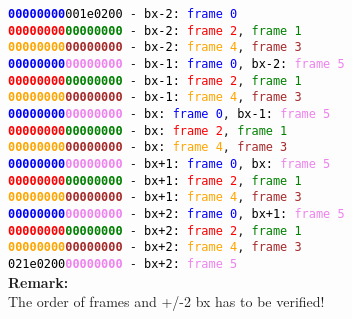 \texttt{\textcolor{blue}{\textbf{00000000}}\textcolor{black}{001e0200} - \textcolor{black}{bx-2:} \textcolor{blue}{frame 0}}\\
\texttt{\textcolor{red}{\textbf{00000000}}\textcolor{green}{\textbf{00000000}} - \textcolor{black}{bx-2:} \textcolor{red}{frame 2}, \textcolor{green}{frame 1}}\\
\texttt{\textcolor{orange}{\textbf{00000000}}\textcolor{brown}{\textbf{00000000}} - \textcolor{black}{bx-2:} \textcolor{orange}{frame 4}, \textcolor{brown}{frame 3}}\\
\texttt{\textcolor{blue}{\textbf{00000000}}\textcolor{violet}{\textbf{00000000}} - \textcolor{black}{bx-1:} \textcolor{blue}{frame 0}, \textcolor{black}{bx-2:} \textcolor{violet}{frame 5}}\\
\texttt{\textcolor{red}{\textbf{00000000}}\textcolor{green}{\textbf{00000000}} - \textcolor{black}{bx-1:} \textcolor{red}{frame 2}, \textcolor{green}{frame 1}}\\
\texttt{\textcolor{orange}{\textbf{00000000}}\textcolor{brown}{\textbf{00000000}} - \textcolor{black}{bx-1:} \textcolor{orange}{frame 4}, \textcolor{brown}{frame 3}}\\
\texttt{\textcolor{blue}{\textbf{00000000}}\textcolor{violet}{\textbf{00000000}} - \textcolor{black}{bx:} \textcolor{blue}{frame 0}, \textcolor{black}{bx-1:} \textcolor{violet}{frame 5}}\\
\texttt{\textcolor{red}{\textbf{00000000}}\textcolor{green}{\textbf{00000000}} - \textcolor{black}{bx:} \textcolor{red}{frame 2}, \textcolor{green}{frame 1}}\\
\texttt{\textcolor{orange}{\textbf{00000000}}\textcolor{brown}{\textbf{00000000}} - \textcolor{black}{bx:} \textcolor{orange}{frame 4}, \textcolor{brown}{frame 3}}\\
\texttt{\textcolor{blue}{\textbf{00000000}}\textcolor{violet}{\textbf{00000000}} - \textcolor{black}{bx+1:} \textcolor{blue}{frame 0}, \textcolor{black}{bx:} \textcolor{violet}{frame 5}}\\
\texttt{\textcolor{red}{\textbf{00000000}}\textcolor{green}{\textbf{00000000}} - \textcolor{black}{bx+1:} \textcolor{red}{frame 2}, \textcolor{green}{frame 1}}\\
\texttt{\textcolor{orange}{\textbf{00000000}}\textcolor{brown}{\textbf{00000000}} - \textcolor{black}{bx+1:} \textcolor{orange}{frame 4}, \textcolor{brown}{frame 3}}\\
\texttt{\textcolor{blue}{\textbf{00000000}}\textcolor{violet}{\textbf{00000000}} - \textcolor{black}{bx+2:} \textcolor{blue}{frame 0}, \textcolor{black}{bx+1:} \textcolor{violet}{frame 5}}\\
\texttt{\textcolor{red}{\textbf{00000000}}\textcolor{green}{\textbf{00000000}} - \textcolor{black}{bx+2:} \textcolor{red}{frame 2}, \textcolor{green}{frame 1}}\\
\texttt{\textcolor{orange}{\textbf{00000000}}\textcolor{brown}{\textbf{00000000}} - \textcolor{black}{bx+2:} \textcolor{orange}{frame 4}, \textcolor{brown}{frame 3}}\\
\texttt{\textcolor{black}{021e0200}\textcolor{violet}{\textbf{00000000}} - \textcolor{black}{bx+2:} \textcolor{violet}{frame 5}}\\

\textbf{Remark:}\\
The order of frames and +/-2 bx has to be verified!
